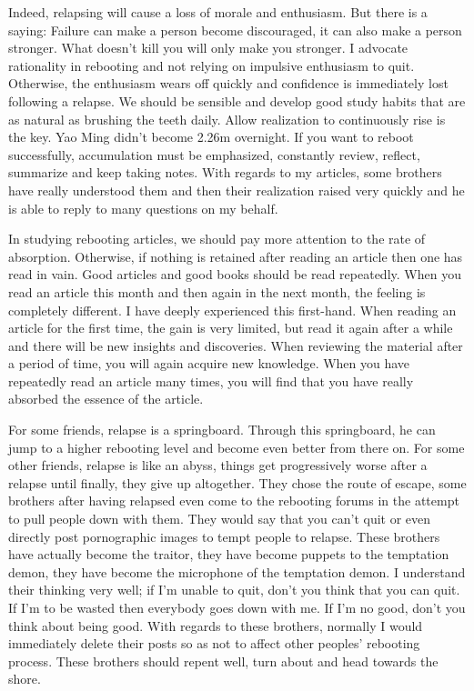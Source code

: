\documentclass[
]{book}
\begin{document}
Indeed, relapsing will cause a loss of morale and enthusiasm. But there is a saying: Failure can make a person become discouraged, it can also make a person stronger. What doesn't kill you will only make you stronger. I advocate rationality in rebooting and not relying on impulsive enthusiasm to quit. Otherwise, the enthusiasm wears off quickly and confidence is immediately lost following a relapse. We should be sensible and develop good study habits that are as natural as brushing the teeth daily. Allow realization to continuously rise is the key. Yao Ming didn't become 2.26m overnight. If you want to reboot successfully, accumulation must be emphasized, constantly review, reflect, summarize and keep taking notes. With regards to my articles, some brothers have really understood them and then their realization raised very quickly and he is able to reply to many questions on my behalf.

In studying rebooting articles, we should pay more attention to the rate of absorption. Otherwise, if nothing is retained after reading an article then one has read in vain. Good articles and good books should be read repeatedly. When you read an article this month and then again in the next month, the feeling is completely different. I have deeply experienced this first-hand. When reading an article for the first time, the gain is very limited, but read it again after a while and there will be new insights and discoveries. When reviewing the material after a period of time, you will again acquire new knowledge. When you have repeatedly read an article many times, you will find that you have really absorbed the essence of the article.

For some friends, relapse is a springboard. Through this springboard, he can jump to a higher rebooting level and become even better from there on. For some other friends, relapse is like an abyss, things get progressively worse after a relapse until finally, they give up altogether. They chose the route of escape, some brothers after having relapsed even come to the rebooting forums in the attempt to pull people down with them. They would say that you can't quit or even directly post pornographic images to tempt people to relapse. These brothers have actually become the traitor, they have become puppets to the temptation demon, they have become the microphone of the temptation demon. I understand their thinking very well; if I'm unable to quit, don't you think that you can quit. If I'm to be wasted then everybody goes down with me. If I'm no good, don't you think about being good. With regards to these brothers, normally I would immediately delete their posts so as not to affect other peoples' rebooting process. These brothers should repent well, turn about and head towards the shore.
\end{document}
